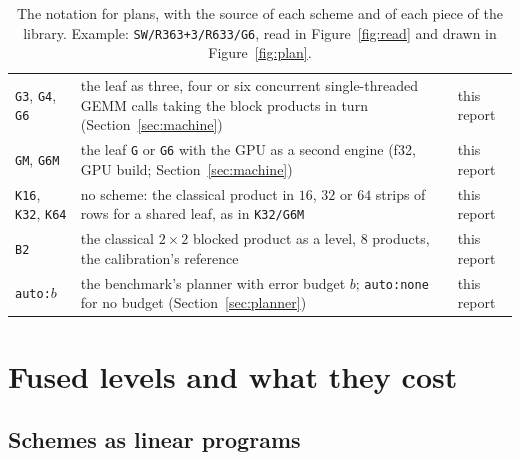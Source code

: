 \documentclass[11pt]{article}
\newcommand{\lv}[1]{\texttt{#1}}
\begin{document}
\begin{table}[!tbp]
\begin{tabular}{@{}l p{} >{\raggedright\arraybackslash}p{}@{}}
\lv{G3}, \lv{G4}, \lv{G6} & the leaf as three, four or six concurrent
  single-threaded GEMM calls taking the block products in turn
  (Section~\ref{sec:machine}) & this report \cite{logic}\\
\lv{GM}, \lv{G6M} & the leaf \lv{G} or \lv{G6} with the GPU as a second
  engine (f32, GPU build; Section~\ref{sec:machine}) & this report \cite{logic}\\
\lv{K16}, \lv{K32}, \lv{K64} & no scheme: the classical product in $16$,
  $32$ or $64$ strips of rows for a shared leaf, as in \lv{K32/G6M} & this report \cite{logic}\\
\lv{B2} & the classical $2\times2$ blocked product as a level, $8$ products,
  the calibration's reference & this report \cite{logic}\\
\addlinespace
\lv{auto:}$b$ & the benchmark's planner with error budget $b$; \lv{auto:none}
  for no budget (Section~\ref{sec:planner}) & this report \cite{logic}\\
\bottomrule
\end{tabular}
\caption{The notation for plans, with the source of each scheme and of each
piece of the library.  Example: \lv{SW/R363+3/R633/G6}, read in
Figure~\ref{fig:read} and drawn in Figure~\ref{fig:plan}.}
\label{tab:notation}
\end{table}


\section{Fused levels and what they cost}\label{sec:levels}

\subsection{Schemes as linear programs}
\end{document}
